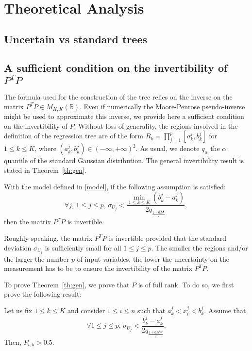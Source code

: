 \documentclass[twoside,11pt]{article}
\begin{document}
\section{Theoretical Analysis}
\label{sec:th}

\subsection{Uncertain vs standard trees}

\subsection{A sufficient condition on the invertibility of $P^T P$}
 
The formula used for the construction of the tree relies on the inverse on the matrix $P^T P\in M_{K,K}(\mathbb{R})$. Even if numerically the Moore-Penrose pseudo-inverse might be used to approximate this inverse, we provide here a sufficient condition on the invertibility of $P$. Without loss of generality, the regions involved in the definition of the regression tree are of the form $R_k =\prod_{j=1}^p [a_k^j,b_k^j]$ for $1\leq k \leq K$, where $(a_k^j, b_k^j) \in (-\infty, +\infty)^2$. As usual, we denote $q_\alpha$ the $\alpha$ quantile of the standard Gaussian distribution. The general invertibility result is stated in Theorem~\ref{th:gen}.
%
\begin{theorem}\label{th:gen}
With the model defined in \eqref{model}, if the following assumption is satisfied:
     \[
     \forall j, \, 1\leq j \leq p, \,
     \sigma_{U_j} < \frac{\min\limits_{1\leq k\leq K}(b_k^j-a_k^j)}{2 q_{\frac{1+0.5^{\frac{1}{p}}}{2}}},
     \]
then the matrix $P^TP$ is invertible.
\end{theorem}
%
Roughly speaking, the matrix $P^T P$ is invertible provided that the standard deviation $\sigma_{U_j}$ is sufficiently small for all $1\leq j \leq p$. The smaller the regions and/or the larger the number $p$ of input variables, the lower the uncertainty on the measurement has to be to ensure the invertibility of the matrix $P^T P$.

To prove Theorem~\ref{th:gen}, we prove that $P$ is of full rank. To do so, we first prove the following result:

\begin{proposition}
\label{prop}
Let us fix $1\leq k \leq K$ and consider $1\leq i \leq n$ such that $a_k^j<x_i^j<b_k^j$. Assume that 
\begin{equation}\label{assSigma}
    \forall 1\leq j \leq p,\, \sigma_{U_j}<\frac{b_k^j-a_k^j}{2q_{\frac{1+0.5^{1/p}}{2}}}.
\end{equation}
Then, $P_{i,k}>0.5$.
\end{proposition}
\end{document}
